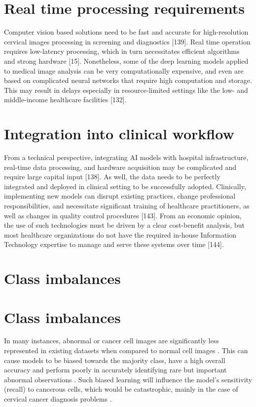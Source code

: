 \documentclass{svjour3}
\begin{document}
\section{Real time processing requirements}
Computer vision based solutions need to be fast and accurate for high-resolution cervical images processing in screening and diagnostics [139]. Real time operation requires low-latency processing, which in turn necessitates efficient algorithms and strong hardware [15]. Nonetheless, some of the deep learning models applied to medical image analysis can be very computationally expensive, and even are based on complicated neural networks that require high computation and storage. This may result in delays especially in resource-limited settings like the low- and middle-income healthcare facilities [132].
\section{Integration into clinical workflow}
From a technical perspective, integrating AI models with hospital infrastructure, real-time data processing, and hardware acquisition may be complicated and require large capital input [138]. As well, the data needs to be perfectly integrated and deployed in clinical setting to be successfully adopted. Clinically, implementing new models can disrupt existing practices, change professional responsibilities, and necessitate significant training of healthcare practitioners, as well as changes in quality control procedures [143]. From an economic opinion, the use of such technologies must be driven by a clear cost-benefit analysis, but most healthcare organizations do not have the required in-house Information Technology expertise to manage and serve these systems over time [144].
\section{Class imbalances}

\section{Class imbalances}
In many instances, abnormal or cancer cell images are significantly less represented in existing datasets when compared to normal cell images \cite{145}. This can cause models to be biased towards the majority class, have a high overall accuracy and perform poorly in accurately identifying rare but important abnormal observations \cite{146,147}. Such biased learning will influence the model’s sensitivity (recall) to cancerous cells, which would be catastrophic, mainly in the case of cervical cancer diagnosis problems \cite{148,149}.
\end{document}
